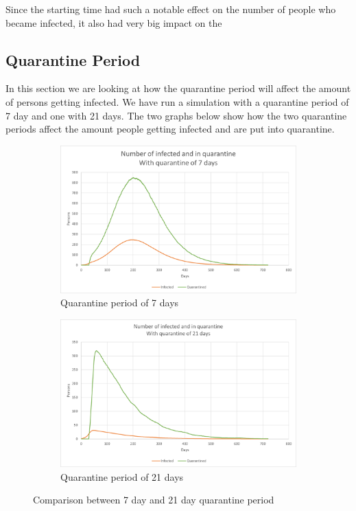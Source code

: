 Since the starting time had such a notable effect on the number of people who became infected, it also had very big impact on the 


\subsection{Quarantine Period}
In this section we are looking at how the quarantine period will affect the amount of persons getting infected. We have run a simulation with a quarantine period of 7 day and one with 21 days. The two graphs below show how the two quarantine periods affect the amount people getting infected and are put into quarantine.


\begin{figure}[H]
\centering
\begin{subfigure}{.5\textwidth}
  \centering
  \includegraphics[width=.95\linewidth]{0_billeder/CT_Q_7.png}
  \caption{Quarantine period of 7 days}
  \label{fig:sub1}
\end{subfigure}%
\begin{subfigure}{.5\textwidth}
  \centering
  \includegraphics[width=.95\linewidth]{0_billeder/CT_Q_21.png}
  \caption{Quarantine period of 21 days}
  \label{fig:sub2}
\end{subfigure}
\caption{Comparison between 7 day and 21 day quarantine period}
\label{fig:test}
\end{figure}

